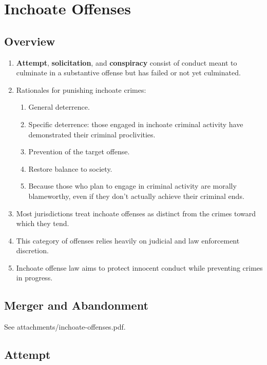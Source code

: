 \section{Inchoate Offenses}

\subsection{Overview}

\begin{enumerate}
    \item \textbf{Attempt}, \textbf{solicitation}, and \textbf{conspiracy} 
    consist of conduct meant to culminate in a substantive offense but has 
    failed or not yet culminated.
    \item Rationales for punishing inchoate crimes:
    \begin{enumerate}
        \item General deterrence.
        \item Specific deterrence: those engaged in inchoate criminal activity 
        have demonstrated their criminal proclivities.
        \item Prevention of the target offense.
        \item Restore balance to society.
        \item Because those who plan to engage in criminal activity are 
        morally blameworthy, even if they don't actually achieve their 
        criminal ends.
    \end{enumerate}
    \item Most jurisdictions treat inchoate offenses as distinct from the 
    crimes toward which they tend.
    \item This category of offenses relies heavily on judicial and law 
    enforcement discretion.
    \item Inchoate offense law aims to protect innocent conduct while 
    preventing crimes in progress.
\end{enumerate}

\subsection{Merger and Abandonment}

See attachments/inchoate-offenses.pdf.

\subsection{Attempt}

